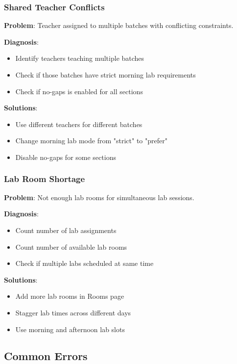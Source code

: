 \documentclass[12pt,a4paper]{article}
\begin{document}
\subsubsection{Shared Teacher Conflicts}

\textbf{Problem}: Teacher assigned to multiple batches with conflicting constraints.

\textbf{Diagnosis}:
\begin{itemize}
\item Identify teachers teaching multiple batches
\item Check if those batches have strict morning lab requirements
\item Check if no-gaps is enabled for all sections
\end{itemize}

\textbf{Solutions}:
\begin{itemize}
\item Use different teachers for different batches
\item Change morning lab mode from "strict" to "prefer"
\item Disable no-gaps for some sections
\end{itemize}

\subsubsection{Lab Room Shortage}

\textbf{Problem}: Not enough lab rooms for simultaneous lab sessions.

\textbf{Diagnosis}:
\begin{itemize}
\item Count number of lab assignments
\item Count number of available lab rooms
\item Check if multiple labs scheduled at same time
\end{itemize}

\textbf{Solutions}:
\begin{itemize}
\item Add more lab rooms in Rooms page
\item Stagger lab times across different days
\item Use morning and afternoon lab slots
\end{itemize}

\subsection{Common Errors}
\end{document}
